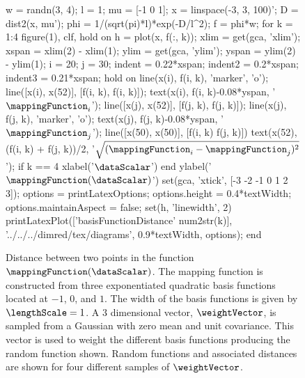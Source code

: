 \begin{figure}
  \begin{matlab}
    w = randn(3, 4);
    l = 1;
    mu = [-1 0 1];
    x = linspace(-3, 3, 100)';
    D = dist2(x, mu');
    phi = 1/(sqrt(pi)*l)*exp(-D/l^2);
    f = phi*w;
    for k = 1:4
      figure(1), clf, hold on
      h = plot(x, f(:, k));
      xlim = get(gca, 'xlim');
      xspan = xlim(2) - xlim(1);
      ylim = get(gca, 'ylim');
      yspan = ylim(2) - ylim(1);
      i = 20; j = 30;
      indent = 0.22*xspan;
      indent2 = 0.2*xspan;
      indent3 = 0.21*xspan;
      hold on
      line(x(i), f(i, k), 'marker', 'o');
      line([x(i), x(52)], [f(i, k), f(i, k)]);
      text(x(i), f(i, k)-0.08*yspan, '$\mappingFunction_i$');
      line([x(j), x(52)], [f(j, k), f(j, k)]);
      line(x(j), f(j, k), 'marker', 'o');
      text(x(j), f(j, k)-0.08*yspan, '$\mappingFunction_j$');
      line([x(50), x(50)], [f(i, k) f(j, k)])
      text(x(52), (f(i, k) + f(j, k))/2, '$\sqrt{(\mappingFunction_i - \mappingFunction_j)^2}$');
      if k == 4
        xlabel('$\dataScalar$')
      end
      ylabel('$\mappingFunction(\dataScalar)$')
      set(gca, 'xtick', [-3 -2 -1 0 1 2 3]);
      options = printLatexOptions;
      options.height = 0.4*textWidth; options.maintainAspect = false;
      set(h, 'linewidth', 2)
      printLatexPlot(['basisFunctionDistance' num2str(k)], '../../../dimred/tex/diagrams', 0.9*textWidth, options);
    end 
  \end{matlab}
  \begin{center}
    
    
    
    
  \end{center}
  \caption{Distance between two points in the function
    $\mappingFunction(\dataScalar)$. The mapping function is
    constructed from three exponentiated quadratic basis functions
    located at $-1$, $0$, and $1$. The width of the basis functions is
    given by $\lengthScale=1$. A 3 dimensional vector,
    $\weightVector$, is sampled from a Gaussian with zero mean and
    unit covariance. This vector is used to weight the different basis
    functions producing the random function shown. Random functions
    and associated distances are shown for four different samples of
    $\weightVector$.}\label{fig:expectedSquareDistance}
\end{figure}

